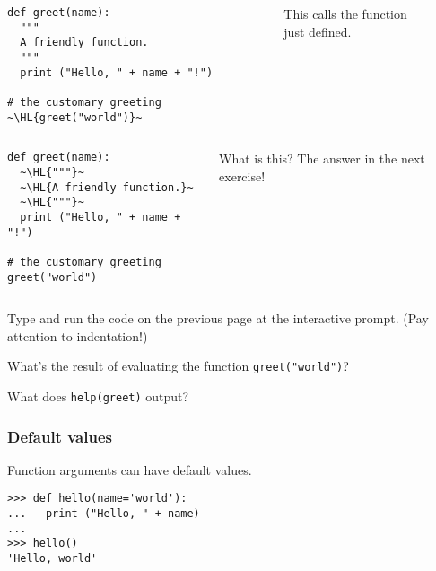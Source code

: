 \documentclass[english,serif,mathserif,xcolor=pdftex,dvipsnames,table]{beamer}
\newcounter{prompt}
\begin{document}
\begin{frame}[fragile]
  \begin{columns}[t]
    \begin{column}{0.5\textwidth}
\begin{lstlisting}
def greet(name):
  """
  A friendly function.
  """
  print ("Hello, " + name + "!")

# the customary greeting
~\HL{greet("world")}~
\end{lstlisting}
    \end{column}
    \begin{column}{0.5\textwidth}
      \raggedleft
      This calls the function \\ just defined.
    \end{column}
  \end{columns}
\end{frame}

\begin{frame}[fragile]
  \begin{columns}[t]
    \begin{column}{0.5\textwidth}
\begin{lstlisting}
def greet(name):
  ~\HL{"""}~
  ~\HL{A friendly function.}~
  ~\HL{"""}~
  print ("Hello, " + name + "!")

# the customary greeting
greet("world")
\end{lstlisting}
    \end{column}
    \begin{column}{0.5\textwidth}
      \raggedleft
      What is this? The answer in the next exercise!
    \end{column}
  \end{columns}
\end{frame}

\begin{frame}
  \begin{exercise*}[2.B]
    Type and run the code on the previous page at the interactive
    prompt. (Pay attention to indentation!)

    \+
    What's the result of evaluating the function \texttt{greet("world")}?

    \+
    What does \texttt{help(greet)} output?
  \end{exercise*}
\end{frame}


\begin{frame}[fragile]
  \frametitle{Default values}

  Function arguments can have default values.
\begin{lstlisting}
>>> def hello(name='world'):
...   print ("Hello, " + name)
...
>>> hello()
'Hello, world'
\end{lstlisting}
\end{frame}
\end{document}
